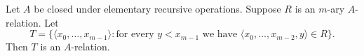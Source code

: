 Let $A$ be closed under elementary recursive operations. Suppose $R$ is an $m$-ary $A$-relation. Let
$$T = \{ \langle x_0, \ldots, x_{m-1} \rangle : \text{for every } y < x_{m-1} \text{ we have } \langle x_0, \ldots, x_{m-2}, y \rangle \in R \}.$$
Then $T$ is an $A$-relation.
